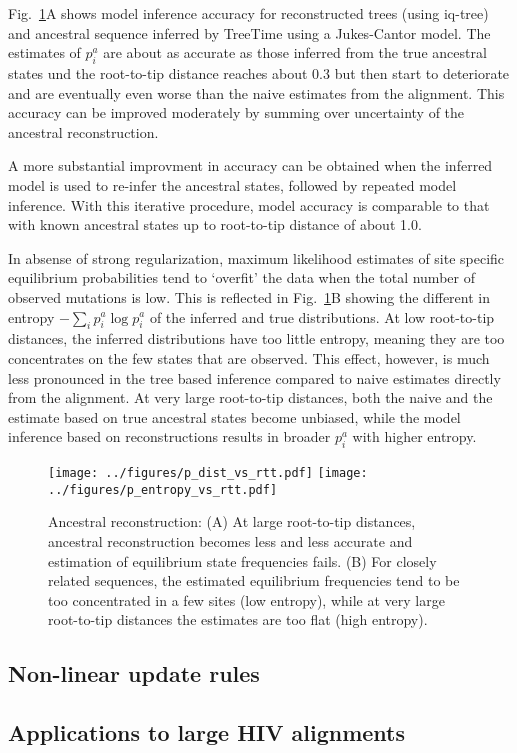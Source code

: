 \documentclass[aps,rmp, onecolumn]{revtex4}
\newcommand{\eqp}{p}
\begin{document}
Fig.~\ref{fig:reconstructed}A shows model inference accuracy for reconstructed trees (using iq-tree) and ancestral sequence inferred by TreeTime using a Jukes-Cantor model.
The estimates of $\eqp_i^a$ are about as accurate as those inferred from the true ancestral states und the root-to-tip distance reaches about 0.3 but then start to deteriorate and are eventually even worse than the naive estimates from the alignment.
This accuracy can be improved moderately by summing over uncertainty of the ancestral reconstruction.

A more substantial improvment in accuracy can be obtained when the inferred model is used to re-infer the ancestral states, followed by repeated model inference.
With this iterative procedure, model accuracy is comparable to that with known ancestral states up to root-to-tip distance of about 1.0.

In absense of strong regularization, maximum likelihood estimates of site specific equilibrium probabilities tend to `overfit' the data when the total number of observed mutations is low.
This is reflected in Fig.~\ref{fig:reconstructed}B showing the different in entropy $-\sum_i \eqp_i^a \log \eqp_i^a$ of the inferred and true distributions.
At low root-to-tip distances, the inferred distributions have too little entropy, meaning they are too concentrates on the few states that are observed.
This effect, however, is much less pronounced in the tree based inference compared to naive estimates directly from the alignment.
At very large root-to-tip distances, both the naive and the estimate based on true ancestral states become unbiased, while the model inference based on reconstructions results in broader $\eqp_i^a$ with higher entropy.


\begin{figure}[tb]
	\centering
	\texttt{[image: ../figures/p\_dist\_vs\_rtt.pdf]}
	\texttt{[image: ../figures/p\_entropy\_vs\_rtt.pdf]}
	\caption{Ancestral reconstruction: (A) At large root-to-tip distances, ancestral reconstruction becomes less and less accurate and estimation of equilibrium state frequencies fails. (B) For closely related sequences, the estimated equilibrium frequencies tend to be too concentrated in a few sites (low entropy), while at very large root-to-tip distances the estimates are too flat (high entropy). }
	\label{fig:reconstructed}
\end{figure}


\subsection*{Non-linear update rules}


\subsection*{Applications to large HIV alignments}




\end{document}
